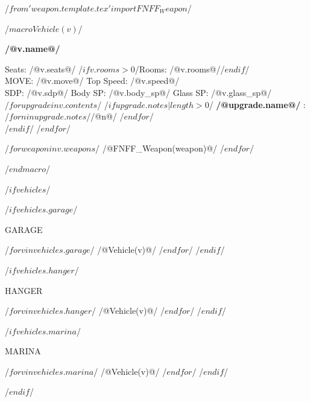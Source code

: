 /$from 'weapon.template.tex' import FNFF_Weapon $/

/$macro Vehicle(v)$/
\begin{minipage}{\columnwidth}
\centerline{\textbf{ /@v.name@/ } }
Seats: /@v.seats@/ /$if v.rooms > 0$/Rooms: /@v.rooms@//$endif$/\\
MOVE: /@v.move@/ Top Speed: /@v.speed@/\\
SDP: /@v.sdp@/ Body SP: /@v.body_sp@/ Glass SP: /@v.glass_sp@/\\

/$for upgrade in v.contents$/
/$if upgrade.notes | length > 0$/\textbf{ /@upgrade.name@/ }: /$for n in upgrade.notes$//@n@/ /$endfor$/\\/$endif$/
/$endfor$/


/$for weapon in v.weapons$/
/@FNFF_Weapon(weapon)@/
/$endfor$/
\hrulefill
\end{minipage}
\vfill\null
/$endmacro$/

/$if vehicles$/
\begin{multicols*}{3}[\noindent {\Large \color{cyberred}{Vehicles}}]

/$if vehicles.garage  $/
\centerline{\large GARAGE}
/$for v in vehicles.garage$/
/@Vehicle(v)@/
/$endfor$/
\vfill\null
/$endif$/

/$if vehicles.hanger $/
\centerline{\large HANGER}
/$for v in vehicles.hanger$/
/@Vehicle(v)@/
/$endfor$/
\vfill\null
/$endif$/

/$if vehicles.marina $/
\centerline{\large MARINA}
/$for v in vehicles.marina$/
/@Vehicle(v)@/
/$endfor$/
\vfill\null
/$endif$/

\end{multicols*}
/$endif$/